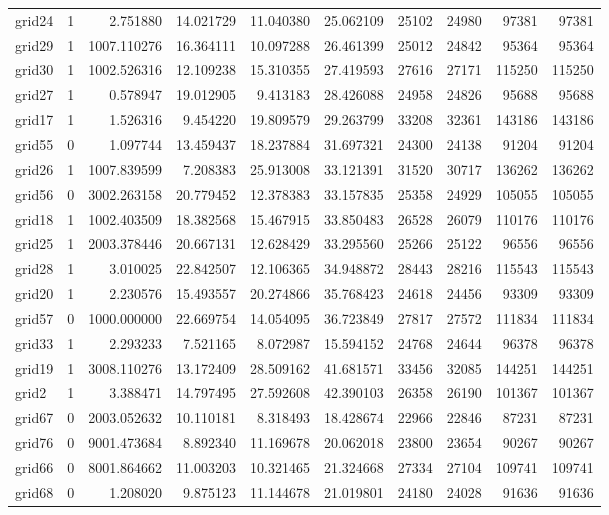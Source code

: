 \begin{longtable}{|l|r|r|r|r|r|r|r|r|r|}
grid24 & 1 & 2.751880 & 14.021729 & 11.040380 & 25.062109 & 25102 & 24980 & 97381 & 97381 \\
grid29 & 1 & 1007.110276 & 16.364111 & 10.097288 & 26.461399 & 25012 & 24842 & 95364 & 95364 \\
grid30 & 1 & 1002.526316 & 12.109238 & 15.310355 & 27.419593 & 27616 & 27171 & 115250 & 115250 \\
grid27 & 1 & 0.578947 & 19.012905 & 9.413183 & 28.426088 & 24958 & 24826 & 95688 & 95688 \\
grid17 & 1 & 1.526316 & 9.454220 & 19.809579 & 29.263799 & 33208 & 32361 & 143186 & 143186 \\
grid55 & 0 & 1.097744 & 13.459437 & 18.237884 & 31.697321 & 24300 & 24138 & 91204 & 91204 \\
grid26 & 1 & 1007.839599 & 7.208383 & 25.913008 & 33.121391 & 31520 & 30717 & 136262 & 136262 \\
grid56 & 0 & 3002.263158 & 20.779452 & 12.378383 & 33.157835 & 25358 & 24929 & 105055 & 105055 \\
grid18 & 1 & 1002.403509 & 18.382568 & 15.467915 & 33.850483 & 26528 & 26079 & 110176 & 110176 \\
grid25 & 1 & 2003.378446 & 20.667131 & 12.628429 & 33.295560 & 25266 & 25122 & 96556 & 96556 \\
grid28 & 1 & 3.010025 & 22.842507 & 12.106365 & 34.948872 & 28443 & 28216 & 115543 & 115543 \\
grid20 & 1 & 2.230576 & 15.493557 & 20.274866 & 35.768423 & 24618 & 24456 & 93309 & 93309 \\
grid57 & 0 & 1000.000000 & 22.669754 & 14.054095 & 36.723849 & 27817 & 27572 & 111834 & 111834 \\
grid33 & 1 & 2.293233 & 7.521165 & 8.072987 & 15.594152 & 24768 & 24644 & 96378 & 96378 \\
grid19 & 1 & 3008.110276 & 13.172409 & 28.509162 & 41.681571 & 33456 & 32085 & 144251 & 144251 \\
grid2 & 1 & 3.388471 & 14.797495 & 27.592608 & 42.390103 & 26358 & 26190 & 101367 & 101367 \\
grid67 & 0 & 2003.052632 & 10.110181 & 8.318493 & 18.428674 & 22966 & 22846 & 87231 & 87231 \\
grid76 & 0 & 9001.473684 & 8.892340 & 11.169678 & 20.062018 & 23800 & 23654 & 90267 & 90267 \\
grid66 & 0 & 8001.864662 & 11.003203 & 10.321465 & 21.324668 & 27334 & 27104 & 109741 & 109741 \\
grid68 & 0 & 1.208020 & 9.875123 & 11.144678 & 21.019801 & 24180 & 24028 & 91636 & 91636 \\

\end{longtable}
